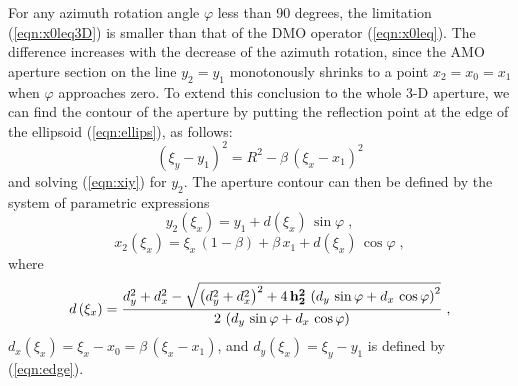 For any azimuth rotation angle $\varphi$ less than 90 degrees, the
limitation (\ref{eqn:x0leq3D}) is smaller than that of the DMO operator
(\ref{eqn:x0leq}). The difference increases with the decrease of the
azimuth rotation, since the AMO aperture section
on the line $y_2=y_1$ monotonously shrinks to a point $x_2=x_0=x_1$
when $\varphi$ approaches zero. To extend this conclusion to the whole
3-D aperture, we can find the contour of the aperture by putting the
reflection point 
at the edge of the ellipsoid (\ref{eqn:ellips}), as follows:  
\begin{equation}
\left(\xi_y-y_1\right)^2= R^2-\beta\,\left(\xi_x-x_1\right)^2
\label{eqn:edge}
\end{equation}
and solving (\ref{eqn:xiy}) for $y_2$. The aperture contour can then be defined by
the system of parametric expressions
\begin{equation}
y_2\left(\xi_x\right)  = 
y_1+d\left(\xi_x\right)\,\sin{\varphi}\;,
\label{eqn:ycon}
\end{equation}
\begin{equation}
x_2\left(\xi_x\right)  =  \xi_x\,(1-\beta)+\beta\,x_1+
d\left(\xi_x\right)\,\cos{\varphi}\;,
\label{eqn:xcon}
\end{equation}
where
\begin{equation}
d\left(\xi_x\right)= 
{{d_y^2+d_x^2-
\sqrt{\left(d_y^2+d_x^2\right)^2+
4\,{\bf h_2^2}\,\left(
d_y\,\sin{\varphi}+d_x\,\cos{\varphi}\right)^2}}\over
{2\,\left(d_y\,\sin{\varphi}+d_x\,\cos{\varphi}
\right)}}\;,
\label{eqn:dxi}
\end{equation}
$d_x\left(\xi_x\right)=\xi_x-x_0=\beta\,\left(\xi_x-x_1\right)$,
and $d_y\left(\xi_x\right)=\xi_y-y_1$ is defined by (\ref{eqn:edge}).
